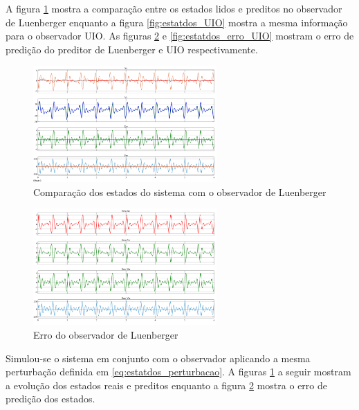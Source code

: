 A figura \ref{fig:estatdos_luenberger} mostra a comparação entre os estados lidos e preditos no observador de Luenberger enquanto a figura \ref{fig:estatdos_UIO} mostra a mesma informação para o observador UIO. As figuras \ref{fig:estatdos_erro_luenberg} e \ref{fig:estatdos_erro_UIO} mostram o erro de predição do preditor de Luenberger e UIO respectivamente.

\FloatBarrier
\begin{figure}[htbp]
    \begin{centering}
    \includegraphics[width=7cm]{img/estatdos_luenberger.png} 
    \caption{Comparação dos estados do sistema com o observador de Luenberger}
    \label{fig:estatdos_luenberger}
    \end{centering}
\end{figure}

\begin{figure}[htbp]
    \begin{centering}
    \includegraphics[width=7cm]{img/estatdos_erro_luenberg.png} 
    \caption{Erro do observador de Luenberger}
    \label{fig:estatdos_erro_luenberg}
    \end{centering}
\end{figure}
\FloatBarrier

Simulou-se o sistema em conjunto com o observador aplicando a mesma perturbação definida em \eqref{eq:estatdos_perturbacao}.
A figuras \ref{fig:estatdos_luenberger} a seguir mostram a evolução dos estados reais e preditos enquanto a figura \ref{fig:estatdos_erro_luenberg} mostra o erro de predição dos estados.

